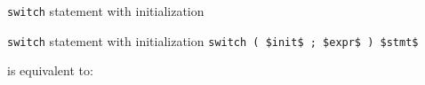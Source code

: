 \begin{frame}{\texttt{switch} statement with initialization}{}
  \begin{block}{\texttt{switch} statement with initialization}
    {
      \hfill\lstinline[mathescape]!switch ( $init$ ; $expr$ ) $stmt$!\hfill
    }

    is equivalent to:

    \smaller
    
  \end{block}

  \begin{example}
  \end{example}
\end{frame}







